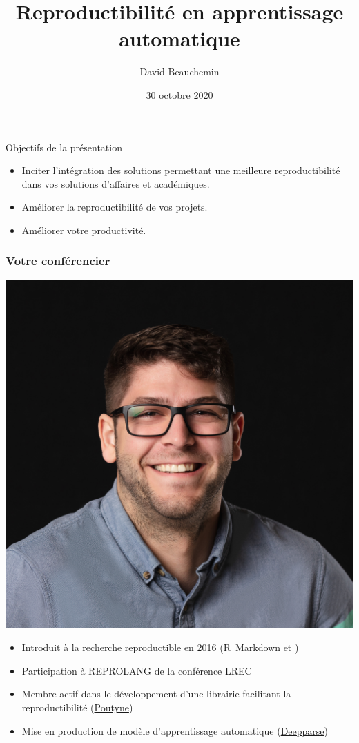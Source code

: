 \documentclass[aspectratio=169,10pt,xcolor=x11names,english,french]{beamer}
\title{Reproductibilité en apprentissage automatique}
\author{David Beauchemin}
\date{30 octobre 2020}
\begin{document}
	
	
	
	
	\begin{frame}{Objectifs de la présentation}
		\begin{itemize}
			\item Inciter l'intégration des solutions permettant une meilleure reproductibilité dans vos solutions d'affaires et académiques.
			\item Améliorer la reproductibilité de vos projets.
			\item Améliorer votre productivité.
		\end{itemize}
		\note{}
	\end{frame}
	
	\begin{frame}
		\frametitle{Votre conférencier}
		
		\begin{minipage}{0.25\linewidth}
			\includegraphics[width=\linewidth,keepaspectratio]{img/david}
		\end{minipage}
		\hfill
		\begin{minipage}{0.70\linewidth}
			\begin{itemize}
				\item Introduit à la recherche reproductible en 2016 (\mbox{R Markdown} et \faGit)
				\item Participation à REPROLANG de la conférence LREC \cite{garneau2020robust}
				\item Membre actif dans le développement d'une librairie facilitant la reproductibilité (\href{https://poutyne.org/}{Poutyne})
				\item Mise en production de modèle d'apprentissage automatique (\href{https://deepparse.org/}{Deepparse})
			\end{itemize}
		\end{minipage}
		

\end{frame}
\end{document}
